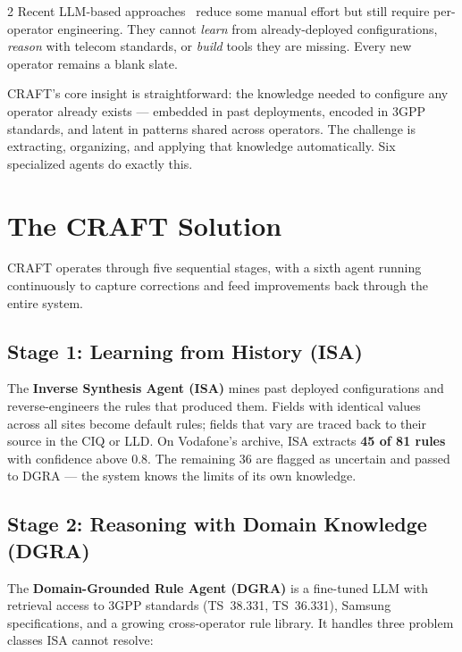 \documentclass[10.5pt]{article}
\begin{document}
\begin{multicols}{2}
Recent LLM-based
approaches~\cite{lira2024largelanguagemodelszero,provvedi2026intentllm,wang2026llmpowered} reduce
some manual effort but still require per-operator engineering. They cannot \emph{learn} from
already-deployed configurations, \emph{reason} with telecom standards, or \emph{build} tools they
are missing. Every new operator remains a blank slate.

CRAFT's core insight is straightforward: the knowledge needed to configure any operator already
exists --- embedded in past deployments, encoded in 3GPP standards, and latent in patterns shared
across operators. The challenge is extracting, organizing, and applying that knowledge
automatically. Six specialized agents do exactly this.

\section{The CRAFT Solution}

CRAFT operates through five sequential stages, with a sixth agent running continuously to capture
corrections and feed improvements back through the entire system.

\subsection*{Stage 1: Learning from History (ISA)}

The \textbf{Inverse Synthesis Agent (ISA)} mines past deployed configurations and
reverse-engineers the rules that produced them. Fields with identical values across all sites
become default rules; fields that vary are traced back to their source in the CIQ or LLD. On
Vodafone's archive, ISA extracts \textbf{45 of 81 rules} with confidence above 0.8. The remaining
36 are flagged as uncertain and passed to DGRA --- the system knows the limits of its own
knowledge.

\subsection*{Stage 2: Reasoning with Domain Knowledge (DGRA)}

The \textbf{Domain-Grounded Rule Agent (DGRA)} is a fine-tuned LLM with retrieval access to 3GPP
standards (TS~38.331, TS~36.331), Samsung specifications, and a growing cross-operator rule
library. It handles three problem classes ISA cannot resolve:

\begin{itemize}[leftmargin=1.1em,itemsep=2pt,topsep=2pt]


\end{itemize}
\end{multicols}
\end{document}
